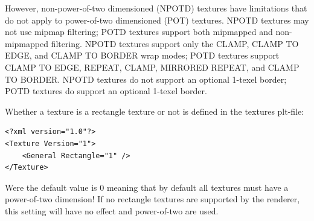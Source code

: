 However, non-power-of-two dimensioned (NPOTD) textures have limitations that do not apply to power-of-two dimensioned (POT) textures. NPOTD textures may not use mipmap filtering; POTD textures support both mipmapped and non-mipmapped filtering. NPOTD textures support only the CLAMP, CLAMP TO EDGE, and CLAMP TO BORDER wrap modes; POTD textures support CLAMP TO EDGE, REPEAT, CLAMP, MIRRORED REPEAT, and CLAMP TO BORDER. NPOTD textures do not support an optional 1-texel border;
POTD textures do support an optional 1-texel border.

Whether a texture is a rectangle texture or not is defined in the textures plt-file:

\begin{lstlisting}[caption=plt-file rectangle texture setup]
<?xml version="1.0"?>
<Texture Version="1">
    <General Rectangle="1" />
</Texture>
\end{lstlisting}

Were the default value is 0 meaning that by default all textures must have a power-of-two dimension! If no rectangle textures are supported by the renderer, this setting will have no effect and power-of-two are used.
